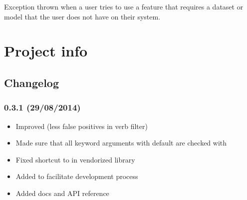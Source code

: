 \documentclass[letterpaper,10pt,english]{sphinxmanual}
\begin{document}
\begin{fulllineitems}
\label{api_reference:textblob.exceptions.MissingCorpusException}
Exception thrown when a user tries to use a feature that requires a
dataset or model that the user does not have on their system.

\end{fulllineitems}



\chapter{Project info}
\label{index:id4}\label{index:project-info}

\section{Changelog}
\label{changelog:changelog}\label{changelog::doc}\label{changelog:id1}

\subsection{0.3.1 (29/08/2014)}
\label{changelog:id2}\begin{itemize}
\item {} 
Improved  (less false positives in verb filter)

\item {} 
Made sure that all keyword arguments with default  are checked with 

\item {} 
Fixed shortcut to  in vendorized library

\item {} 
Added  to facilitate development process

\item {} 
Added docs and API reference

\end{itemize}
\end{document}
